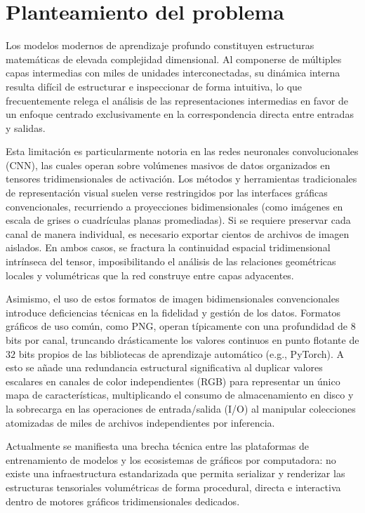 \section{Planteamiento del problema}
Los modelos modernos de aprendizaje profundo constituyen estructuras matemáticas de elevada complejidad dimensional. 
Al componerse de múltiples capas intermedias con miles de unidades interconectadas, su dinámica interna resulta difícil 
de estructurar e inspeccionar de forma intuitiva, lo que frecuentemente relega el análisis de las representaciones 
intermedias en favor de un enfoque centrado exclusivamente en la correspondencia directa entre entradas y salidas.
\medskip

Esta limitación es particularmente notoria en las redes neuronales convolucionales (CNN), las cuales operan sobre 
volúmenes masivos de datos organizados en tensores tridimensionales de activación. Los métodos y herramientas 
tradicionales de representación visual suelen verse restringidos por las interfaces gráficas convencionales, 
recurriendo a proyecciones bidimensionales (como imágenes en escala de grises o cuadrículas planas promediadas). 
Si se requiere preservar cada canal de manera individual, es necesario exportar cientos de archivos de imagen aislados. 
En ambos casos, se fractura la continuidad espacial tridimensional intrínseca del tensor, imposibilitando el análisis de 
las relaciones geométricas locales y volumétricas que la red construye entre capas adyacentes.
\medskip

Asimismo, el uso de estos formatos de imagen bidimensionales convencionales introduce deficiencias técnicas en la fidelidad 
y gestión de los datos. Formatos gráficos de uso común, como PNG, operan típicamente con una profundidad de $8$ bits por 
canal, truncando drásticamente los valores continuos en punto flotante de $32$ bits propios de las bibliotecas de aprendizaje 
automático (e.g., PyTorch). A esto se añade una redundancia estructural significativa al duplicar valores escalares en canales 
de color independientes (RGB) para representar un único mapa de características, multiplicando el consumo de almacenamiento 
en disco y la sobrecarga en las operaciones de entrada/salida (I/O) al manipular colecciones atomizadas de miles de archivos independientes por inferencia.
\medskip

Actualmente se manifiesta una brecha técnica entre las plataformas de entrenamiento de modelos y los ecosistemas de 
gráficos por computadora: no existe una infraestructura estandarizada que permita serializar y renderizar las estructuras 
tensoriales volumétricas de forma procedural, directa e interactiva dentro de motores gráficos tridimensionales dedicados.
\medskip

